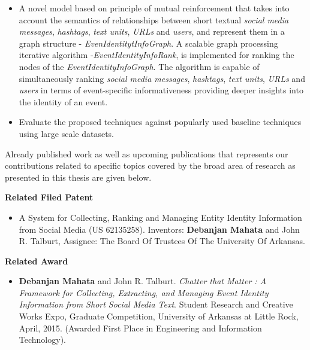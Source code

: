 \documentclass[12pt]{article}
\begin{document}
\begin{itemize}
\item A novel model based on principle of mutual reinforcement that takes into account the semantics of relationships between short textual \textit{social media messages}, \textit{hashtags}, \textit{text units}, \textit{URLs} and \textit{users}, and represent them in a graph structure - \textit{EvenIdentitytInfoGraph}. A scalable graph processing iterative algorithm -\textit{EventIdentityInfoRank}, is implemented for ranking the nodes of the \textit{EventIdentityInfoGraph}. The algorithm is capable of simultaneously ranking \textit{social media messages}, \textit{hashtags}, \textit{text units}, \textit{URLs} and \textit{users} in terms of event-specific informativeness providing deeper insights into the identity of an event.

\item Evaluate the proposed techniques against popularly used baseline techniques using large scale datasets.

\end{itemize}

Already published work as well as upcoming publications that represents our contributions related to specific topics covered by the broad area of research as presented in this thesis are given below.

\textbf{\LARGE Related Filed Patent}
\begin{itemize}
\item A System for Collecting, Ranking and Managing Entity Identity Information from Social Media (US 62135258). Inventors: \textbf{Debanjan Mahata} and John R. Talburt, Assignee: The Board Of Trustees Of The University Of Arkansas.
\end{itemize}

\textbf{\LARGE Related Award}
\begin{itemize}
\item \textbf{Debanjan Mahata} and John R. Talburt. \textit{Chatter that Matter : A Framework for Collecting, Extracting, and Managing Event Identity Information from Short Social Media Text}. Student Research and Creative Works Expo, Graduate Competition, University of Arkansas at Little Rock, April, 2015. (Awarded First Place in Engineering and Information Technology).  
\end{itemize}
\end{document}
